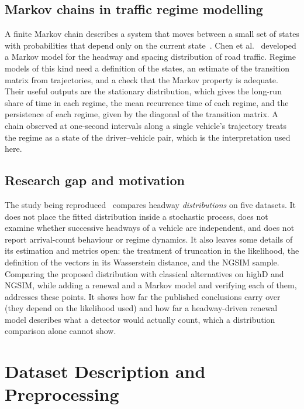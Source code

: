 \documentclass[11pt,a4paper]{article}
\numberwithin{equation}{section}
\begin{document}
\subsection{Markov chains in traffic regime modelling}
A finite Markov chain describes a system that moves between a small set of states with probabilities that depend only on the current state~\cite{norris1997}. Chen et al.~\cite{chen2010} developed a Markov model for the headway and spacing distribution of road traffic.
Regime models of this kind need a definition of the states, an estimate of the transition matrix from trajectories, and a check that the Markov property is adequate. Their useful outputs are the stationary distribution,
which gives the long-run share of time in each regime, the mean recurrence time of each regime, and the persistence of each regime, given by the diagonal of the transition matrix. A chain observed at one-second intervals along a single vehicle's trajectory
treats the regime as a state of the driver--vehicle pair, which is the interpretation used here.

\subsection{Research gap and motivation}
The study being reproduced~\cite{leungbootnak} compares headway \emph{distributions} on five datasets. It does not place the
fitted distribution inside a stochastic process, does not examine whether successive headways of a vehicle are independent,
and does not report arrival-count behaviour or regime dynamics. It also leaves some details of its estimation and metrics
open: the treatment of truncation in the likelihood, the definition of the vectors in its Wasserstein distance, and the NGSIM sample. Comparing
the proposed distribution with classical alternatives on highD and NGSIM, while adding a renewal and a Markov model and
verifying each of them, addresses these points. It shows how far the published conclusions carry over (they depend on the likelihood used) and how far a headway-driven renewal model
describes what a detector would actually count, which a distribution comparison alone cannot show.

\section{Dataset Description and Preprocessing}\label{sec:data}
\end{document}

